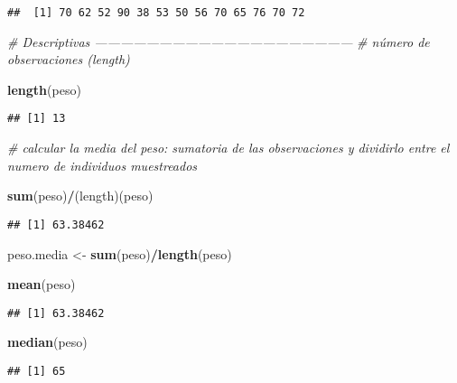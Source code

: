 \documentclass[
]{article}
\newenvironment{Shaded}{\begin{snugshade}}{\end{snugshade}}
\newcommand{\CommentTok}[1]{\textcolor[rgb]{0.56,0.35,0.01}{\textit{#1}}}
\newcommand{\KeywordTok}[1]{\textcolor[rgb]{0.13,0.29,0.53}{\textbf{#1}}}
\newcommand{\NormalTok}[1]{#1}
\newcommand{\OperatorTok}[1]{\textcolor[rgb]{0.81,0.36,0.00}{\textbf{#1}}}
\newcommand{\StringTok}[1]{\textcolor[rgb]{0.31,0.60,0.02}{#1}}
\begin{document}
\begin{verbatim}
##  [1] 70 62 52 90 38 53 50 56 70 65 76 70 72
\end{verbatim}

\begin{Shaded}
\begin{Highlighting}[]
\CommentTok{# Descriptivas ------------------------------------------------------------}
\CommentTok{# número de observaciones (length)}

 \KeywordTok{length}\NormalTok{(peso)}
\end{Highlighting}
\end{Shaded}

\begin{verbatim}
## [1] 13
\end{verbatim}

\begin{Shaded}
\begin{Highlighting}[]
 \CommentTok{# calcular la media del peso: sumatoria de las observaciones y dividirlo entre el numero de individuos muestreados}
 
 \KeywordTok{sum}\NormalTok{(peso)}\OperatorTok{/}\NormalTok{(length)(peso)}
\end{Highlighting}
\end{Shaded}

\begin{verbatim}
## [1] 63.38462
\end{verbatim}

\begin{Shaded}
\begin{Highlighting}[]
\NormalTok{ peso.media <-}\StringTok{ }\KeywordTok{sum}\NormalTok{(peso)}\OperatorTok{/}\KeywordTok{length}\NormalTok{(peso)}
 

 \KeywordTok{mean}\NormalTok{(peso)}
\end{Highlighting}
\end{Shaded}

\begin{verbatim}
## [1] 63.38462
\end{verbatim}

\begin{Shaded}
\begin{Highlighting}[]
 \KeywordTok{median}\NormalTok{(peso)}
\end{Highlighting}
\end{Shaded}

\begin{verbatim}
## [1] 65
\end{verbatim}
\end{document}
